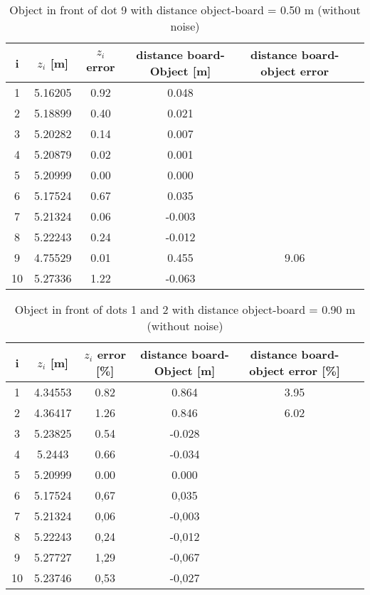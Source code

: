 \begin{table}[H]
\centering
\caption{Object in front of dot 9 with distance object-board = 0.50 m (without noise)}
\label{res50cm}
\renewcommand{\arraystretch}{1.5}
\begin{tabular}{|c|c|c|c|c|c|}
\hline
i & $z_i$ [m] & $z_i$ error\footnotemark[1] [\%] & distance board-Object [m] & distance board-object error\footnotemark[1] [\%] \\
\hline
1 & 5.16205 & 0.92 & 0.048 & \\
\hline
2 & 5.18899 & 0.40 & 0.021 & \\
\hline
3 & 5.20282 & 0.14 & 0.007 & \\
\hline
4 & 5.20879 & 0.02 & 0.001 & \\
\hline
5 & 5.20999 & 0.00 & 0.000 & \\
\hline
6 & 5.17524 & 0.67 & 0.035 & \\
\hline 
7 & 5.21324 & 0.06 & -0.003 & \\
\hline
8 & 5.22243 & 0.24 & -0.012 & \\
\hline
9 & 4.75529 & 0.01 & 0.455 & 9.06 \\
\hline
10 & 5.27336 & 1.22 & -0.063 & \\
\hline
\end{tabular}
\end{table}

\begin{table}[H]
\centering
\caption{Object in front of dots 1 and 2 with distance object-board = 0.90 m (without noise)}
\label{res90cm}
\renewcommand{\arraystretch}{1.5}
\begin{tabular}{|c|c|c|c|c|c|}
\hline
i & $z_i$ [m] & $z_i$ error [\%] & distance board-Object [m] & distance board-object error [\%] \\
\hline
1 & 4.34553 & 0.82 & 0.864 & 3.95 \\
\hline
2 & 4.36417  & 1.26 & 0.846 & 6.02 \\
\hline
3 & 5.23825 & 0.54 & -0.028 & \\
\hline
4 & 5.2443 & 0.66 & -0.034 & \\
\hline
5 & 5.20999 &	0.00 & 0.000 & \\
\hline
6 & 5.17524 &	0,67 & 0,035 & \\
\hline
7 & 5.21324	& 0,06 & -0,003 & \\
\hline
8 & 5.22243	& 0,24 & -0,012 & \\
\hline
9 & 5.27727	& 1,29 & -0,067 & \\
\hline
10 & 5.23746 & 0,53 &	-0,027 & \\
\hline
\end{tabular}
\end{table}


